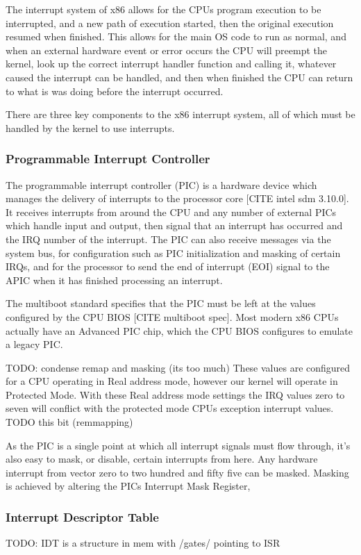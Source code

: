 \documentclass[11pt]{report}
\begin{document}
The interrupt system of x86 allows for the CPUs program execution to be interrupted, and a new path of execution started, then the original execution resumed when finished.
This allows for the main OS code to run as normal, and when an external hardware event or error occurs the CPU will preempt the kernel, look up the correct interrupt handler function and calling it, whatever caused the interrupt can be handled, and then when finished the CPU can return to what is was doing before the interrupt occurred.

There are three key components to the x86 interrupt system, all of which must be handled by the kernel to use interrupts.

\subsubsection{Programmable Interrupt Controller}
The programmable interrupt controller (PIC) is a hardware device which manages the delivery of interrupts to the processor core [CITE intel sdm 3.10.0]. It receives interrupts from around the CPU and any number of external PICs which handle input and output, then signal that an interrupt has occurred and the IRQ number of the interrupt. The PIC can also receive messages via the system bus, for configuration such as PIC initialization and masking of certain IRQs, and for the processor to send the end of interrupt (EOI) signal to the APIC when it has finished processing an interrupt.

The multiboot standard specifies that the PIC must be left at the values configured by the CPU BIOS [CITE multiboot spec]. Most modern x86 CPUs actually have an Advanced PIC chip, which the CPU BIOS configures to emulate a legacy PIC.

TODO: condense remap and masking (its too much)
These values are configured for a CPU operating in Real address mode, however our kernel will operate in Protected Mode. With these Real address mode settings the IRQ values zero to seven will conflict with the protected mode CPUs exception interrupt values. TODO this bit (remmapping)

As the PIC is a single point at which all interrupt signals must flow through, it's also easy to mask, or disable, certain interrupts from here. Any hardware interrupt from vector zero to two hundred and fifty five can be masked. Masking is achieved by altering the PICs Interrupt Mask Register, 


\subsubsection{Interrupt Descriptor Table}
TODO: IDT is a structure in mem with /gates/ pointing to ISR
\end{document}
